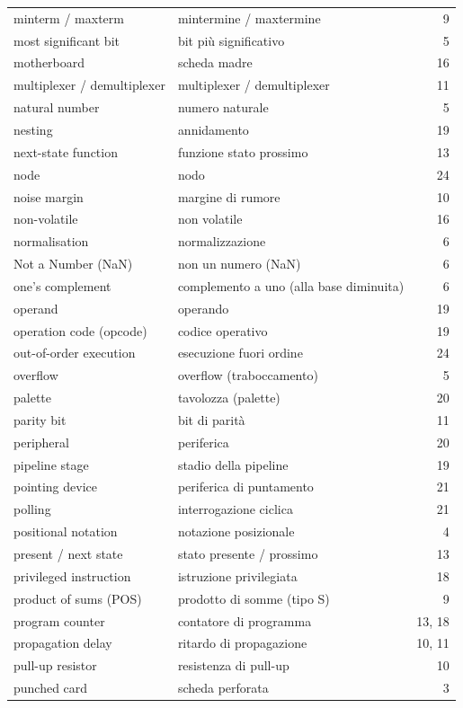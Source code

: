 {\begin{longtable}{@{}p{}p{}r@{}}
minterm / maxterm & mintermine / maxtermine & 9\\
most significant bit & bit più significativo & 5\\
motherboard & scheda madre & 16\\
multiplexer / demultiplexer & multiplexer / demultiplexer & 11\\
natural number & numero naturale & 5\\
nesting & annidamento & 19\\
next-state function & funzione stato prossimo & 13\\
node & nodo & 24\\
noise margin & margine di rumore & 10\\
non-volatile & non volatile & 16\\
normalisation & normalizzazione & 6\\
Not a Number (NaN) & non un numero (NaN) & 6\\
one's complement & complemento a uno (alla base diminuita) & 6\\
operand & operando & 19\\
operation code (opcode) & codice operativo & 19\\
out-of-order execution & esecuzione fuori ordine & 24\\
overflow & overflow (traboccamento) & 5\\
palette & tavolozza (palette) & 20\\
parity bit & bit di parità & 11\\
peripheral & periferica & 20\\
pipeline stage & stadio della pipeline & 19\\
pointing device & periferica di puntamento & 21\\
polling & interrogazione ciclica & 21\\
positional notation & notazione posizionale & 4\\
present / next state & stato presente / prossimo & 13\\
privileged instruction & istruzione privilegiata & 18\\
product of sums (POS) & prodotto di somme (tipo S) & 9\\
program counter & contatore di programma & 13, 18\\
propagation delay & ritardo di propagazione & 10, 11\\
pull-up resistor & resistenza di pull-up & 10\\
punched card & scheda perforata & 3\\

\end{longtable}}
